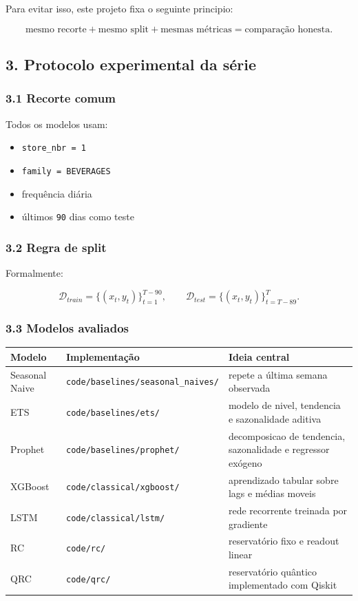 \documentclass[12pt]{article}
\providecommand{\tightlist}{%
  \setlength{\itemsep}{0pt}\setlength{\parskip}{0pt}}
\begin{document}
Para evitar isso, este projeto fixa o seguinte principio:

\[
\text{mesmo recorte} + \text{mesmo split} + \text{mesmas métricas} = \text{comparação honesta}.
\]

\subsection{3. Protocolo experimental da série}\label{3-protocolo-experimental-da-suxe9rie}

\subsubsection{3.1 Recorte comum}\label{31-recorte-comum}

Todos os modelos usam:

\begin{itemize}
\tightlist
\item
  \texttt{store\_nbr\ =\ 1}
\item
  \texttt{family\ =\ BEVERAGES}
\item
  frequência diária
\item
  últimos \texttt{90} dias como teste
\end{itemize}

\subsubsection{3.2 Regra de split}\label{32-regra-de-split}

Formalmente:

\[
\mathcal{D}_{train} = \{(x_t, y_t)\}_{t=1}^{T-90},
\qquad
\mathcal{D}_{test} = \{(x_t, y_t)\}_{t=T-89}^T.
\]

\subsubsection{3.3 Modelos avaliados}\label{33-modelos-avaliados}

\begin{longtable}[]{@{}lll@{}}
\toprule\noalign{}
Modelo & Implementação & Ideia central \\
\midrule\noalign{}
\endhead
\bottomrule\noalign{}
\endlastfoot
Seasonal Naive & \texttt{code/baselines/seasonal\_naives/} & repete a última semana observada \\
ETS & \texttt{code/baselines/ets/} & modelo de nivel, tendencia e sazonalidade aditiva \\
Prophet & \texttt{code/baselines/prophet/} & decomposicao de tendencia, sazonalidade e regressor exógeno \\
XGBoost & \texttt{code/classical/xgboost/} & aprendizado tabular sobre lags e médias moveis \\
LSTM & \texttt{code/classical/lstm/} & rede recorrente treinada por gradiente \\
RC & \texttt{code/rc/} & reservatório fixo e readout linear \\
QRC & \texttt{code/qrc/} & reservatório quântico implementado com Qiskit \\
\end{longtable}
\end{document}
